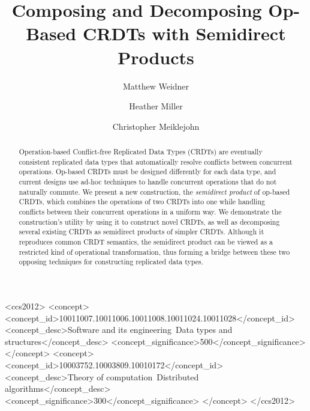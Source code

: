 \documentclass[acmsmall,nonacm,12pt]{acmart}
\theoremstyle{plain}
\theoremstyle{definition}
\begin{document}
\title[Composing and Decomposing Op-Based CRDTs with Semidirect Products]{Composing and Decomposing Op-Based CRDTs with Semidirect Products}

\author{Matthew Weidner}

\author{Heather Miller}

\author{Christopher Meiklejohn}

\begin{abstract}
Operation-based Conflict-free Replicated Data Types (CRDTs) are eventually consistent replicated data types that automatically resolve conflicts between concurrent operations.  Op-based CRDTs must be designed differently for each data type, and current designs use ad-hoc techniques to handle concurrent operations that do not naturally commute.  We present a new construction, the \textit{semidirect product} of op-based CRDTs, which combines the operations of two CRDTs into one while handling conflicts between their concurrent operations in a uniform way.  We demonstrate the construction's utility by using it to construct novel CRDTs, as well as decomposing several existing CRDTs as semidirect products of simpler CRDTs.  Although it reproduces common CRDT semantics, the semidirect product can be viewed as a restricted kind of operational transformation, thus forming a bridge between these two opposing techniques for constructing replicated data types.
\end{abstract}

\begin{CCSXML}
<ccs2012>
   <concept>
       <concept_id>10011007.10011006.10011008.10011024.10011028</concept_id>
       <concept_desc>Software and its engineering~Data types and structures</concept_desc>
       <concept_significance>500</concept_significance>
       </concept>
   <concept>
       <concept_id>10003752.10003809.10010172</concept_id>
       <concept_desc>Theory of computation~Distributed algorithms</concept_desc>
       <concept_significance>300</concept_significance>
       </concept>
 </ccs2012>
\end{CCSXML}
\end{document}
